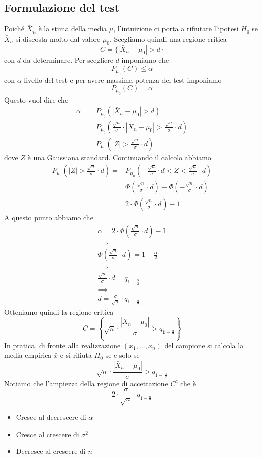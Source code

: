 \subsection{Formulazione del test}
Poiché $\bar{X}_n$ è la stima della media $\mu$, l'intuizione ci porta a rifiutare l'ipotesi $H_0$
se $\bar{X}_n$ si discosta molto dal valore $\mu_0$. Scegliamo quindi una regione critica
\[ C = \{ | \bar{X}_n - \mu_0 | > d \} \]
con $d$ da determinare. Per scegliere $d$ imponiamo che
\[ P_{\mu_0} (C) \leq \alpha \]
con $\alpha$ livello del test e per avere massima potenza del test imponiamo
\[ P_{\mu_0} (C) = \alpha \]
Questo vuol dire che
\begin{align*}
	\alpha = & P_{\mu_0} ( | \bar{X}_n - \mu_0 | > d )                        \\
	=        & P_{\mu_0} \left( \frac{\sqrt{n}}{\sigma} \cdot
	|\bar{X}_n - \mu_0| > \frac{\sqrt{n}}{\sigma} \cdot d \right)             \\
	=        & P_{\mu_0} \left( |Z| > \frac{\sqrt{n}}{\sigma} \cdot d \right)
\end{align*}
dove $Z$ è una Gaussiana standard. Continuando il calcolo abbiamo
\begin{align*}
	P_{\mu_0} \left( |Z| > \frac{\sqrt{n}}{\sigma} \cdot d \right)
	= & P_{\mu_0} \left( -\frac{\sqrt{n}}{\sigma} \cdot d < Z
	< \frac{\sqrt{n}}{\sigma} \cdot d \right)                           \\
	= & \Phi \left( \frac{\sqrt{n}}{\sigma} \cdot d \right) -
	\Phi \left( -\frac{\sqrt{n}}{\sigma} \cdot d \right)                \\
	= & 2 \cdot \Phi \left( \frac{\sqrt{n}}{\sigma} \cdot d \right) - 1
\end{align*}
A questo punto abbiamo che
\begin{gather*}
	\alpha = 2 \cdot \Phi \left( \frac{\sqrt{n}}{\sigma} \cdot d \right) - 1 \\
	\implies \\
	\Phi \left( \frac{\sqrt{n}}{\sigma} \cdot d \right) = 1 - \frac{\alpha}{2} \\
	\implies \\
	\frac{\sqrt{n}}{\sigma} \cdot d = q_{1 - \frac{\alpha}{2}} \\
	\implies \\
	d = \frac{\sigma}{\sqrt{n}} \cdot q_{1 - \frac{\alpha}{2}}
\end{gather*}
Otteniamo quindi la regione critica
\[
	C = \left\{ \sqrt{n} \cdot \frac{|\bar{X}_n -
		\mu_0|}{\sigma} > q_{1 - \frac{\alpha}{2}} \right\}
\]
In pratica, di fronte alla realizzazione $(x_1, \dots, x_n)$ del campione si calcola la media
empirica $\bar{x}$ e si rifiuta $H_0$ se e solo se
\[ \sqrt{n} \cdot \frac{|\bar{X}_n - \mu_0|}{\sigma} > q_{1 - \frac{\alpha}{2}}  \]
Notiamo che l'ampiezza della regione di accettazione $C^c$ che è
\[ 2 \cdot \frac{\sigma}{\sqrt{n}} \cdot q_{1 - \frac{\alpha}{2}} \]
\begin{itemize}
	\item Cresce al decrescere di $\alpha$
	\item Cresce al crescere di $\sigma^2$
	\item Decresce al crescere di $n$
\end{itemize}


